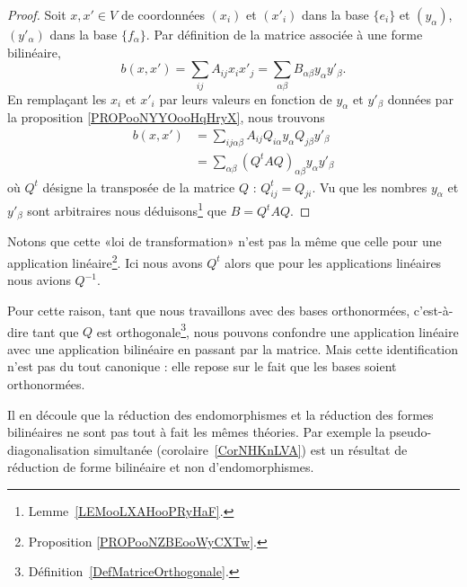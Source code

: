 \begin{proof}
    Soit \( x,x'\in V\) de coordonnées \( (x_i)\) et \( (x'_i)\) dans la base \( \{ e_i \}\) et \( (y_{\alpha})\), \( (y'_{\alpha})\) dans la base \( \{ f_{\alpha} \}\). Par définition de la matrice associée à une forme bilinéaire,
    \begin{equation}
        b(x,x')=\sum_{ij}A_{ij}x_ix'_j=\sum_{\alpha\beta}B_{\alpha\beta}y_{\alpha}y'_{\beta}.
    \end{equation}
    En remplaçant les \( x_i\) et \( x'_i\) par leurs valeurs en fonction de \( y_{\alpha}\) et \( y'_{\beta}\) données par la proposition \ref{PROPooNYYOooHqHryX}, nous trouvons
    \begin{subequations}
        \begin{align}
            b(x,x')&=\sum_{ij\alpha\beta}A_{ij}Q_{i\alpha}y_{\alpha}Q_{j\beta}y'_{\beta}\\
            &=\sum_{\alpha\beta}(Q^tAQ)_{\alpha\beta}y_{\alpha}y'_{\beta}
        \end{align}
    \end{subequations}
    où \( Q^t\) désigne la transposée de la matrice \( Q\) :  \( Q^t_{ij}=Q_{ji}\). Vu que les nombres \( y_{\alpha}\) et \( y'_{\beta}\) sont arbitraires nous déduisons\footnote{Lemme~\ref{LEMooLXAHooPRyHaF}.} que \( B=Q^tAQ\).
\end{proof}

\begin{remark}      \label{REMooNEJLooSqgeih}
    Notons que cette «loi de transformation» n'est pas la même que celle pour une application linéaire\footnote{Proposition \ref{PROPooNZBEooWyCXTw}.}. Ici nous avons \( Q^t\) alors que pour les applications linéaires nous avions \( Q^{-1}\).

    Pour cette raison, tant que nous travaillons avec des bases orthonormées, c'est-à-dire tant que \( Q\) est orthogonale\footnote{Définition~\ref{DefMatriceOrthogonale}.}, nous pouvons confondre une application linéaire avec une application bilinéaire en passant par la matrice. Mais cette identification n'est pas du tout canonique : elle repose sur le fait que les bases soient orthonormées.

    Il en découle que la réduction des endomorphismes et la réduction des formes bilinéaires ne sont pas tout à fait les mêmes théories. Par exemple la pseudo-diagonalisation simultanée (corolaire~\ref{CorNHKnLVA}) est un résultat de réduction de forme bilinéaire et non d'endomorphismes.
\end{remark}

